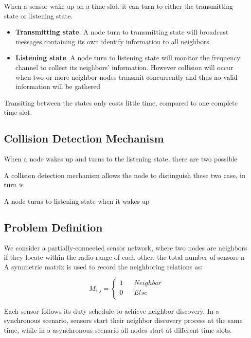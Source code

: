 When a sensor wake up on a time slot, it can turn to either the transmitting state or listening state. 
\begin{itemize}
\item \textbf{Transmitting state}. A node turn to transmitting state will broadcast messages containing its own identify 
information to all neighbors.
\item  \textbf{Listening state}. A node turn to listening state will monitor the frequency channel to collect its neighbors' information.
However collision will occur when two or more neighbor nodes transmit concurrently and thus no valid information will be gathered
\end{itemize}
Transiting between the states only costs little time, compared to one complete time slot.

\subsection{Collision Detection Mechanism}

When a node wakes up and turns to the listening state, there are two possible 



A collision detection mechanism allows the node to distinguish these two case, in turn is 


A node turns to listening state when it wakes up




\subsection{Problem Definition}

We consider a partially-connected sensor network, 
where two nodes are neighbors if they locate within the radio range of each other. the total number of sensors n
A  symmetric matrix is used to record the neighboring relations as:

$$ M_{i,j}=\left\{
\begin{aligned}
1  & & {Neighbor}\\
0  & & {Else}\\
\end{aligned}
\right.
$$

 Each sensor follows its duty schedule to achieve neighbor discovery. In a synchronous scenario,
 sensors start their neighbor discovery process at the same time, while in a asynchronous  scenario
 all nodes start at different time slots.
 
